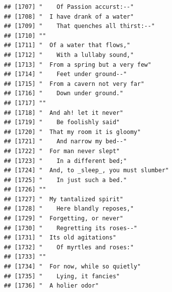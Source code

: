 \documentclass{article}\usepackage[]{graphicx}\usepackage[]{color}
\makeatletter
\newenvironment{kframe}{%
 \def\at@end@of@kframe{}%
 \ifinner\ifhmode%
  \def\at@end@of@kframe{\end{minipage}}%
  \begin{minipage}{\columnwidth}%
 \fi\fi%
 \def\FrameCommand##1{\hskip\@totalleftmargin \hskip-\fboxsep
 \colorbox{shadecolor}{##1}\hskip-\fboxsep
     \hskip-\linewidth \hskip-\@totalleftmargin \hskip\columnwidth}%
 \MakeFramed {\advance\hsize-\width
   \@totalleftmargin\z@ \linewidth\hsize
   \@setminipage}}%
 {\par\unskip\endMakeFramed%
 \at@end@of@kframe}
\newenvironment{knitrout}{}{} %
\makeatother
\begin{document}
\begin{knitrout}
\begin{kframe}
\begin{verbatim}
## [1707] "    Of Passion accurst:--"                                                   
## [1708] "  I have drank of a water"                                                   
## [1709] "    That quenches all thirst:--"                                             
## [1710] ""                                                                            
## [1711] "  Of a water that flows,"                                                    
## [1712] "    With a lullaby sound,"                                                   
## [1713] "  From a spring but a very few"                                              
## [1714] "    Feet under ground--"                                                     
## [1715] "  From a cavern not very far"                                                
## [1716] "    Down under ground."                                                      
## [1717] ""                                                                            
## [1718] "  And ah! let it never"                                                      
## [1719] "    Be foolishly said"                                                       
## [1720] "  That my room it is gloomy"                                                 
## [1721] "    And narrow my bed--"                                                     
## [1722] "  For man never slept"                                                       
## [1723] "    In a different bed;"                                                     
## [1724] "  And, to _sleep_, you must slumber"                                         
## [1725] "    In just such a bed."                                                     
## [1726] ""                                                                            
## [1727] "  My tantalized spirit"                                                      
## [1728] "    Here blandly reposes,"                                                   
## [1729] "  Forgetting, or never"                                                      
## [1730] "    Regretting its roses--"                                                  
## [1731] "  Its old agitations"                                                        
## [1732] "    Of myrtles and roses:"                                                   
## [1733] ""                                                                            
## [1734] "  For now, while so quietly"                                                 
## [1735] "    Lying, it fancies"                                                       
## [1736] "  A holier odor"                                                             

\end{verbatim}
\end{kframe}
\end{knitrout}
\end{document}
